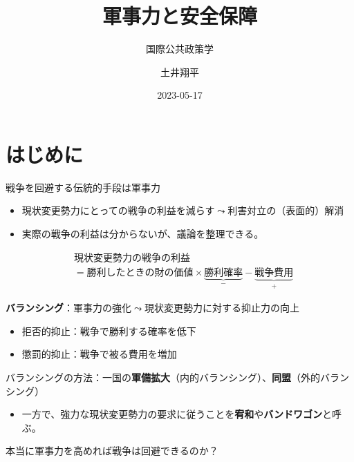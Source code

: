\documentclass[
  xelatex,
  ja=standard]{bxjsarticle}
\title{軍事力と安全保障}
\subtitle{国際公共政策学}
\author{土井翔平}
\date{2023-05-17}
\providecommand{\tightlist}{%
  \setlength{\itemsep}{0pt}\setlength{\parskip}{0pt}}\usepackage{longtable,booktabs,array}
\begin{document}
\maketitle
\ifdefined\Shaded\renewenvironment{Shaded}{\begin{tcolorbox}[boxrule=0pt, sharp corners, frame hidden, interior hidden, enhanced, borderline west={3pt}{0pt}{shadecolor}, breakable]}{\end{tcolorbox}}\fi

\hypertarget{ux306fux3058ux3081ux306b}{%
\section*{はじめに}\label{ux306fux3058ux3081ux306b}}

戦争を回避する伝統的手段は軍事力

\begin{itemize}
\tightlist
\item
  現状変更勢力にとっての戦争の利益を減らす\(\leadsto\)利害対立の（表面的）解消
\item
  実際の戦争の利益は分からないが、議論を整理できる。
\end{itemize}

\[
\begin{split}
&\textrm{現状変更勢力の戦争の利益} \\
&= \textrm{勝利したときの財の価値} \times \underbrace{\textrm{勝利確率}}_{-} - \underbrace{\textrm{戦争費用}}_{+}
\end{split}
\]

\textbf{バランシング}：軍事力の強化\(\leadsto\)現状変更勢力に対する抑止力の向上

\begin{itemize}
\tightlist
\item
  拒否的抑止：戦争で勝利する確率を低下
\item
  懲罰的抑止：戦争で被る費用を増加
\end{itemize}

バランシングの方法：一国の\textbf{軍備拡大}（内的バランシング）、\textbf{同盟}（外的バランシング）

\begin{itemize}
\tightlist
\item
  一方で、強力な現状変更勢力の要求に従うことを\textbf{宥和}や\textbf{バンドワゴン}と呼ぶ\citep{schweller1994}。
\end{itemize}

本当に軍事力を高めれば戦争は回避できるのか？
\end{document}
